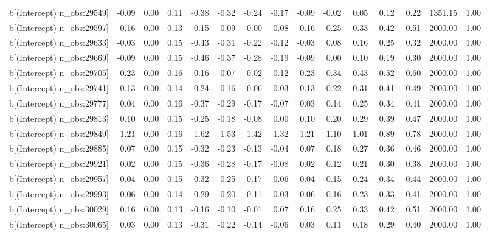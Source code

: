 \begin{table}[ht]
\begin{tabular}{rrrrrrrrrrrrrrr}
  b[(Intercept) n\_obs:29549] & -0.09 & 0.00 & 0.11 & -0.38 & -0.32 & -0.24 & -0.17 & -0.09 & -0.02 & 0.05 & 0.12 & 0.22 & 1351.15 & 1.00 \\ 
  b[(Intercept) n\_obs:29597] & 0.16 & 0.00 & 0.13 & -0.15 & -0.09 & 0.00 & 0.08 & 0.16 & 0.25 & 0.33 & 0.42 & 0.51 & 2000.00 & 1.00 \\ 
  b[(Intercept) n\_obs:29633] & -0.03 & 0.00 & 0.15 & -0.43 & -0.31 & -0.22 & -0.12 & -0.03 & 0.08 & 0.16 & 0.25 & 0.32 & 2000.00 & 1.00 \\ 
  b[(Intercept) n\_obs:29669] & -0.09 & 0.00 & 0.15 & -0.46 & -0.37 & -0.28 & -0.19 & -0.09 & 0.00 & 0.10 & 0.19 & 0.30 & 2000.00 & 1.00 \\ 
  b[(Intercept) n\_obs:29705] & 0.23 & 0.00 & 0.16 & -0.16 & -0.07 & 0.02 & 0.12 & 0.23 & 0.34 & 0.43 & 0.52 & 0.60 & 2000.00 & 1.00 \\ 
  b[(Intercept) n\_obs:29741] & 0.13 & 0.00 & 0.14 & -0.24 & -0.16 & -0.06 & 0.03 & 0.13 & 0.22 & 0.31 & 0.41 & 0.49 & 2000.00 & 1.00 \\ 
  b[(Intercept) n\_obs:29777] & 0.04 & 0.00 & 0.16 & -0.37 & -0.29 & -0.17 & -0.07 & 0.03 & 0.14 & 0.25 & 0.34 & 0.41 & 2000.00 & 1.00 \\ 
  b[(Intercept) n\_obs:29813] & 0.10 & 0.00 & 0.15 & -0.25 & -0.18 & -0.08 & 0.00 & 0.10 & 0.20 & 0.29 & 0.39 & 0.47 & 2000.00 & 1.00 \\ 
  b[(Intercept) n\_obs:29849] & -1.21 & 0.00 & 0.16 & -1.62 & -1.53 & -1.42 & -1.32 & -1.21 & -1.10 & -1.01 & -0.89 & -0.78 & 2000.00 & 1.00 \\ 
  b[(Intercept) n\_obs:29885] & 0.07 & 0.00 & 0.15 & -0.32 & -0.23 & -0.13 & -0.04 & 0.07 & 0.18 & 0.27 & 0.36 & 0.46 & 2000.00 & 1.00 \\ 
  b[(Intercept) n\_obs:29921] & 0.02 & 0.00 & 0.15 & -0.36 & -0.28 & -0.17 & -0.08 & 0.02 & 0.12 & 0.21 & 0.30 & 0.38 & 2000.00 & 1.00 \\ 
  b[(Intercept) n\_obs:29957] & 0.04 & 0.00 & 0.15 & -0.32 & -0.25 & -0.17 & -0.06 & 0.04 & 0.15 & 0.24 & 0.34 & 0.44 & 2000.00 & 1.00 \\ 
  b[(Intercept) n\_obs:29993] & 0.06 & 0.00 & 0.14 & -0.29 & -0.20 & -0.11 & -0.03 & 0.06 & 0.16 & 0.23 & 0.33 & 0.41 & 2000.00 & 1.00 \\ 
  b[(Intercept) n\_obs:30029] & 0.16 & 0.00 & 0.13 & -0.16 & -0.10 & -0.01 & 0.07 & 0.16 & 0.25 & 0.33 & 0.42 & 0.51 & 2000.00 & 1.00 \\ 
  b[(Intercept) n\_obs:30065] & 0.03 & 0.00 & 0.13 & -0.31 & -0.22 & -0.14 & -0.06 & 0.03 & 0.11 & 0.18 & 0.29 & 0.40 & 2000.00 & 1.00 \\ 

\end{tabular}
\end{table}
